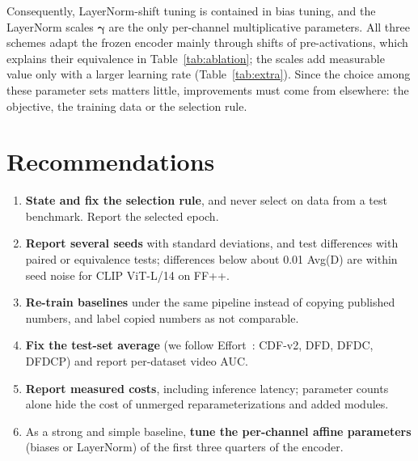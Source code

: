 \documentclass[fonts]{icst}
\begin{document}
Consequently, LayerNorm-shift tuning is contained in bias tuning, and the LayerNorm scales $\boldsymbol{\gamma}$ are the only per-channel multiplicative parameters. All three schemes adapt the frozen encoder mainly through shifts of pre-activations, which explains their equivalence in Table~\ref{tab:ablation}; the scales add measurable value only with a larger learning rate (Table~\ref{tab:extra}). Since the choice among these parameter sets matters little, improvements must come from elsewhere: the objective, the training data or the selection rule.

\section{Recommendations}
\label{sec:recommend}
\begin{enumerate}[leftmargin=*, topsep=2pt, itemsep=2pt]
    \item \textbf{State and fix the selection rule}, and never select on data from a test benchmark. Report the selected epoch.
    \item \textbf{Report several seeds} with standard deviations, and test differences with paired or equivalence tests; differences below about 0.01 Avg(D) are within seed noise for CLIP ViT-L/14 on FF++.
    \item \textbf{Re-train baselines} under the same pipeline instead of copying published numbers, and label copied numbers as not comparable.
    \item \textbf{Fix the test-set average} (we follow Effort~\cite{yan2025effort}: CDF-v2, DFD, DFDC, DFDCP) and report per-dataset video AUC.
    \item \textbf{Report measured costs}, including inference latency; parameter counts alone hide the cost of unmerged reparameterizations and added modules.
    \item As a strong and simple baseline, \textbf{tune the per-channel affine parameters} (biases or LayerNorm) of the first three quarters of the encoder.
\end{enumerate}

\end{document}
